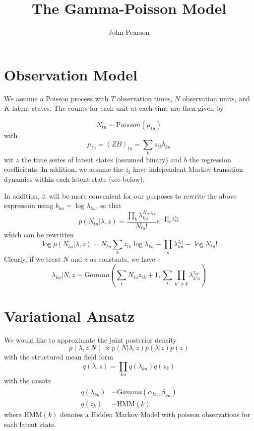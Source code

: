 \documentclass[11pt]{article}
\begin{document}
\title{The Gamma-Poisson Model}
\author{John Pearson}
\maketitle

\section{Observation Model}
We assume a Poisson process with $T$ observation times, $N$ observation units, and $K$ latent states. The counts for each unit at each time are then given by 

\begin{equation}
    N_{tu} \sim {\mathrm Poisson}(\mu_{tu})    
\end{equation}
with 
\begin{equation}
   \mu_{tu} = (ZB)_{tu} = \sum_k z_{tk} b_{ku} 
\end{equation}
wit $z$ the time series of latent states (assumed binary) and $b$ the regression coefficients. In addition, we assume the $z_t$ have independent Markov transition dynamics within each latent state (see below).

In addition, it will be more convenient for our purposes to rewrite the above expression using $b_{ku} = \log \lambda_{ku}$, so that 
\begin{equation}
    p(N_{tu}|\lambda, z) = \frac{\prod_k \lambda_{ku}^{N_{tu} z_{tk}}}{N_{tu}!} e^{-\prod_k \lambda_{ku}^{z_{tk}}}
\end{equation}
which can be rewritten
\begin{equation}
    \log p(N_{tu}|\lambda, z) = N_{tu} \sum_k z_{tk} \log \lambda_{ku} - \prod_k \lambda_{ku}^{z_{tk}} - \log N_{tu}!
\end{equation}
Clearly, if we treat $N$ and $z$ as constants, we have
\begin{equation}
    \lambda_{ku}|N, z \sim {\mathrm Gamma}(\sum_t N_{tu}z_{tk} + 1, \sum_t\prod_{k'\neq k} \lambda_{k'u}^{z_{tk'}})
\end{equation}

\section{Variational Ansatz}
We would like to approximate the joint posterior density
\begin{equation}
    p(\lambda, z|N) \propto p(N|\lambda, z) p(\lambda|z) p(z)
\end{equation}
with the structured mean field form
\begin{equation}
     q(\lambda, z) = \prod_{ku} q(\lambda_{ku})q(z_k)
\end{equation} 
with the ansatz
\begin{align} 
    q(\lambda_{ku}) &\sim {\mathrm Gamma}(\alpha_{ku}, \beta_{ku}) \\
    q(z_k) &\sim \mathrm{HMM}(k)
\end{align}
where $\mathrm{HMM}(k)$ denotes a Hidden Markov Model with poisson observations for each latent state.
\end{document}
